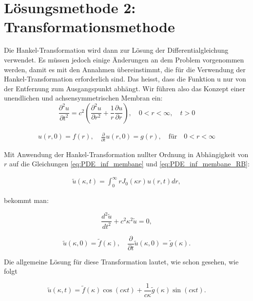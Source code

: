 %
%
%
\section{Lösungsmethode 2: Transformationsmethode
\label{kreismembran:section:teil3}}
Die Hankel-Transformation wird dann zur Lösung der Differentialgleichung verwendet. Es müssen jedoch einige Änderungen an dem Problem vorgenommen werden, damit es mit den Annahmen übereinstimmt, die für die Verwendung der Hankel-Transformation erforderlich sind. Das heisst, dass die Funktion u nur von der Entfernung zum Ausgangspunkt abhängt. Wir führen also das Konzept einer unendlichen und achsensymmetrischen Membran ein:
\begin{equation*}
	\frac{\partial^2u}{\partial t^2}
	=
	c^2  \left(\frac{\partial^2 u}{\partial r^2}
	+
	\frac{1}{r}
	\frac{\partial u}{\partial r} \right), \quad 0<r<\infty, \quad t>0
	\label{eq:PDE_inf_membane}
\end{equation*}

\begin{align}
	u(r,0)=f(r), \quad \frac{\partial}{\partial t} u(r,0) = g(r), \quad \text{für} \quad 0<r<\infty
	\label{eq:PDE_inf_membane_RB}
\end{align}

Mit Anwendung der Hankel-Transformation nullter Ordnung in Abhängigkeit von $r$ auf die Gleichungen \eqref{eq:PDE_inf_membane} und \eqref{eq:PDE_inf_membane_RB}:

\begin{align}
	\tilde{u}(\kappa,t)=\int_{0}^{\infty}r J_0(\kappa r)u(r,t) dr,
\end{align}

bekommt man:

\begin{equation*}
	\frac{d^2 \tilde{u}}{dt^2} + c^2\kappa^2\tilde{u}=0,
\end{equation*}

\begin{equation*}
	\tilde{u}(\kappa,0)=\tilde{f}(\kappa), \quad 
	\frac{\partial}{\partial t}\tilde{u}(\kappa,0)=\tilde{g}(\kappa).
\end{equation*}

Die allgemeine Lösung für diese Transformation lautet, wie schon gesehen, wie folgt

\begin{equation*}
	\tilde{u}(\kappa,t)=\tilde{f}(\kappa)\cos(c\kappa t) + \frac{1}{c\kappa}\tilde{g}(\kappa)\sin(c\kappa t).
\end{equation*}

